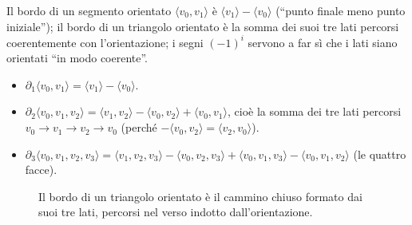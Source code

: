 \begin{intuizione}
Il bordo di un segmento orientato $\langle v_0, v_1 \rangle$ \`e $\langle v_1 \rangle - \langle v_0 \rangle$ (``punto finale meno punto iniziale''); il bordo di un triangolo orientato \`e la somma dei suoi tre lati percorsi coerentemente con l'orientazione; i segni $(-1)^i$ servono a far s\`i che i lati siano orientati ``in modo coerente''.
\end{intuizione}

\begin{ejemplo}
\begin{itemize}
    \item $\partial_1 \langle v_0, v_1 \rangle = \langle v_1 \rangle - \langle v_0 \rangle$.
    \item $\partial_2 \langle v_0, v_1, v_2 \rangle = \langle v_1, v_2 \rangle - \langle v_0, v_2 \rangle + \langle v_0, v_1 \rangle$, cio\`e la somma dei tre lati percorsi $v_0 \to v_1 \to v_2 \to v_0$ (perch\'e $-\langle v_0, v_2 \rangle = \langle v_2, v_0 \rangle$).
    \item $\partial_3 \langle v_0, v_1, v_2, v_3 \rangle = \langle v_1, v_2, v_3 \rangle - \langle v_0, v_2, v_3 \rangle + \langle v_0, v_1, v_3 \rangle - \langle v_0, v_1, v_2 \rangle$ (le quattro facce).
\end{itemize}
\end{ejemplo}

\begin{figure}[H]
    \centering
    \caption{Il bordo di un triangolo orientato \`e il cammino chiuso formato dai suoi tre lati, percorsi nel verso indotto dall'orientazione.}
\end{figure}


